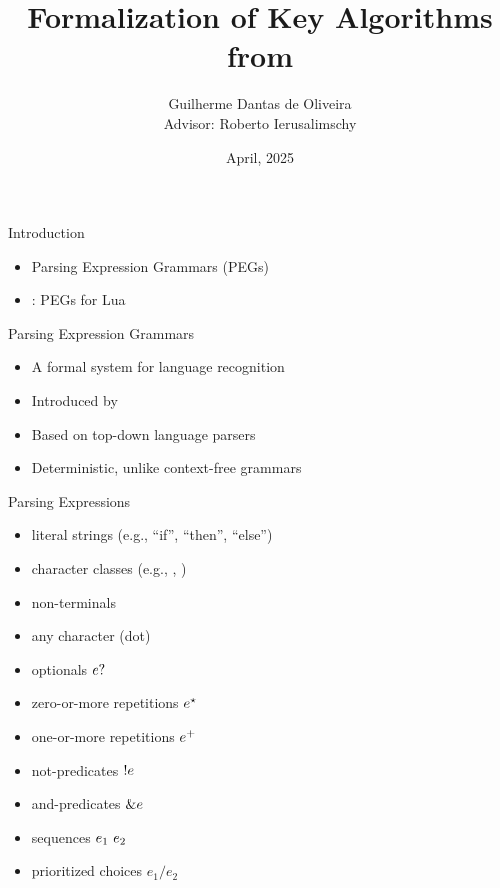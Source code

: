 \documentclass{beamer}
\title[Master's Thesis Defense]%
{Formalization of Key Algorithms from \lpeg{}}
\author[Guilherme Dantas]
{Guilherme Dantas de Oliveira \texorpdfstring{\\ \vspace{10pt}}{and}
\footnotesize Advisor: Roberto Ierusalimschy}
\institute[PUC-Rio]%
{Pontifical Catholic University of Rio de Janeiro}
\date{April, 2025}
\begin{document}
\begin{frame}
    \titlepage
\end{frame}

\begin{frame}{Introduction}
    \begin{itemize}
        \item Parsing Expression Grammars (PEGs)
        \item \lpeg{}: PEGs for Lua
    \end{itemize}
\end{frame}

\begin{frame}{Parsing Expression Grammars}
    \begin{itemize}
        \item A formal system for language recognition
        \item Introduced by \cite{ford_parsing_2004}
        \item Based on top-down language parsers
        \item Deterministic, unlike context-free grammars
    \end{itemize}
\end{frame}

\begin{frame}{Parsing Expressions}
    \begin{itemize}
        \item literal strings (e.g., ``if'', ``then'', ``else'')
        \item character classes (e.g., , )
        \item non-terminals
        \item any character (dot)
        \item optionals $e?$
        \item zero-or-more repetitions $e^\star$
        \item one-or-more repetitions $e^+$
        \item not-predicates $!e$
        \item and-predicates $\&e$
        \item sequences $e_1\ e_2$
        \item prioritized choices $e_1/e_2$
    \end{itemize}
\end{frame}

\newcommand{\FordMatch}[4]{#1 \vdash (#2, #3) \rightsquigarrow #4}
\end{document}
